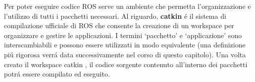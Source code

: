 Per poter eseguire codice ROS serve un ambiente che permetta l'organizzazione e l'utilizzo di tutti i pacchetti necessari.
Al riguardo, \textbf{catkin} \'{e} il sistema di compilazione ufficiale di ROS che consente la creazione di un workspace per 
organizzare e gestire le applicazioni.
I termini `pacchetto' e `applicazione' sono interscambiabili e possono essere utilizzati in modo equivalente (una definizione pi\'{u} 
rigorosa verr\'{a} data successivamente nel corso di questo capitolo).
Una volta creato il workspace catkin \cite{catkin_ws}, il codice sorgente contenuto all'interno dei pacchetti potr\'{a} essere 
compilato ed eseguito.
